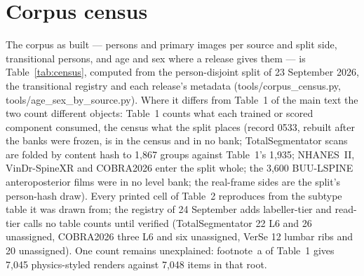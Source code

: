 \section*{Corpus census}
The corpus as built --- persons and primary images per source and split side, transitional persons, and age and sex
where a release gives them --- is Table~\ref{tab:census}, computed from the person-disjoint split of 23 September
2026, the transitional registry and each release's metadata (tools/corpus\_census.py, tools/age\_sex\_by\_source.py).
Where it differs from Table~1 of the main text the two count different objects: Table~1 counts what each trained or
scored component consumed, the census what the split places (record 0533, rebuilt after the banks were frozen, is in
the census and in no bank; TotalSegmentator scans are folded by content hash to 1,867 groups against Table~1's 1,935;
NHANES~II, VinDr-SpineXR and COBRA2026 enter the split whole; the 3,600 BUU-LSPINE anteroposterior films were in no
level bank; the real-frame sides are the split's person-hash draw). Every printed cell of Table~2 reproduces from the
subtype table it was drawn from; the registry of 24 September adds labeller-tier and read-tier calls no table counts
until verified (TotalSegmentator 22 L6 and 26 unassigned, COBRA2026 three L6 and six unassigned, VerSe 12 lumbar ribs
and 20 unassigned). One count remains unexplained: footnote~a of Table~1 gives 7,045 physics-styled renders against
7,048 items in that root.

